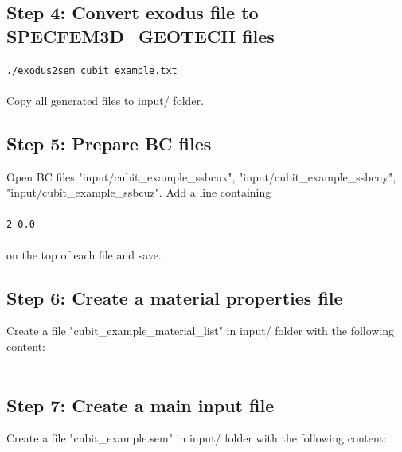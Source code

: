 \subsection*{Step 4: Convert exodus file to SPECFEM3D\_GEOTECH files}

\texttt{./exodus2sem cubit\_example.txt}\\
\\
Copy all generated files to input/ folder.

\subsection*{Step 5: Prepare BC files}

Open BC files "input/cubit\_example\_ssbcux", "input/cubit\_example\_ssbcuy", "input/cubit\_example\_ssbcuz". Add a line containing\\
\\
\texttt{2 0.0}\\
\\
on the top of each file and save.

\subsection*{Step 6: Create a material properties file}

Create a file "cubit\_example\_material\_list" in input/ folder with the following content:
\\
\\
\colorbox{gray}{
\parbox{16cm}{
}}

\subsection*{Step 7: Create a main input file}

Create a file "cubit\_example.sem" in input/ folder with the following content:
\\


